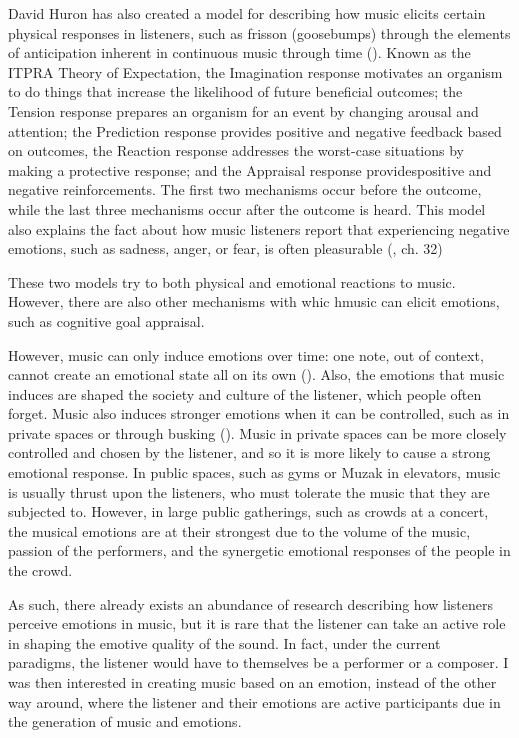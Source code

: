 \documentclass{article}
\renewcommand{\_}[1]{\underline{ #1 }}
\theoremstyle{definition}
\begin{document}
David Huron has also created a model for describing how music elicits certain physical responses in listeners, such as frisson (goosebumps) through the elements of anticipation inherent in continuous music through time (\cite{huron2006}). Known as the ITPRA Theory of Expectation, the Imagination response motivates an organism to do things that increase the likelihood of future beneficial outcomes; the Tension response prepares an organism for an event by changing arousal and attention; the Prediction response provides positive and negative feedback based on outcomes, the Reaction response addresses the worst-case situations by making a protective response; and the Appraisal response providespositive and negative reinforcements. The first two mechanisms occur before the outcome, while the last three mechanisms occur after the outcome is heard. This model also explains the fact about how  music listeners report that experiencing negative emotions, such as sadness, anger, or fear, is often pleasurable (\cite{juslin2019}, ch. 32)

These two models try to both physical and emotional reactions to music. However, there are also other mechanisms with whic hmusic can elicit emotions, such as cognitive goal appraisal.

However, music can only induce emotions over time: one note, out of context, cannot create an emotional state all on its own (\cite{schubert2001}). Also, the emotions that music induces are shaped the society and culture of the listener, which people often forget. Music also induces stronger emotions when it can be controlled, such as in private spaces or through busking (\cite{oneill2001}). Music in private spaces can be more closely controlled and chosen by the listener, and so it is more likely to cause a strong emotional response. In public spaces, such as gyms or Muzak in elevators, music is usually thrust upon the listeners, who must tolerate the music that they are subjected to. However, in large public gatherings, such as crowds at a concert, the musical emotions are at their strongest due to the volume of the music, passion of the performers, and the synergetic emotional responses of the people in the crowd. 

As such, there already exists an abundance of research describing how listeners perceive emotions in music, but it is rare that the listener can take an active role in shaping the emotive quality of the sound. In fact, under the current paradigms, the listener would have to themselves be a performer or a composer. I was then interested in creating music based on an emotion, instead of the other way around, where the listener and their emotions are active participants due in the generation of music and emotions.
\end{document}
